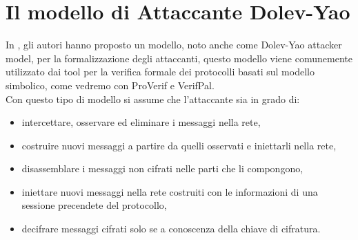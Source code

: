 \section{Il modello di Attaccante Dolev-Yao}
\label{sec:dy}

In \cite{DY83}, gli autori hanno proposto un modello, noto anche come Dolev-Yao attacker model, per la formalizzazione degli attaccanti, questo modello viene comunemente utilizzato dai tool per la verifica formale dei protocolli basati sul modello simbolico, come vedremo con ProVerif e VerifPal.\\
Con questo tipo di modello si assume che l'attaccante sia in grado di:

\begin{itemize}
    \item intercettare, osservare ed eliminare i messaggi nella rete,
    \item costruire nuovi messaggi a partire da quelli osservati e iniettarli nella rete,
    \item disassemblare i messaggi non cifrati nelle parti che li compongono,
    \item iniettare nuovi messaggi nella rete costruiti con le informazioni di una sessione precendete del protocollo,
    \item decifrare messaggi cifrati solo se a conoscenza della chiave di cifratura.
\end{itemize}

